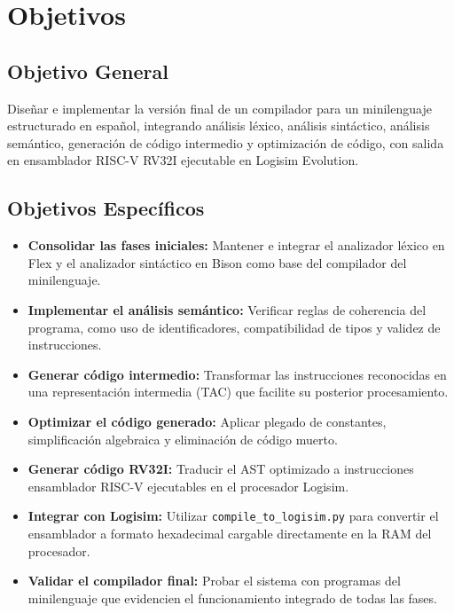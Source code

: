 \section{Objetivos}

\subsection{Objetivo General}

Diseñar e implementar la versión final de un compilador para un minilenguaje estructurado en español, integrando análisis léxico, análisis sintáctico, análisis semántico, generación de código intermedio y optimización de código, con salida en ensamblador RISC-V RV32I ejecutable en Logisim Evolution.

\subsection{Objetivos Específicos}

\begin{itemize}
    \item \textbf{Consolidar las fases iniciales:} Mantener e integrar el analizador léxico en Flex y el analizador sintáctico en Bison como base del compilador del minilenguaje.
    \item \textbf{Implementar el análisis semántico:} Verificar reglas de coherencia del programa, como uso de identificadores, compatibilidad de tipos y validez de instrucciones.
    \item \textbf{Generar código intermedio:} Transformar las instrucciones reconocidas en una representación intermedia (TAC) que facilite su posterior procesamiento.
    \item \textbf{Optimizar el código generado:} Aplicar plegado de constantes, simplificación algebraica y eliminación de código muerto.
    \item \textbf{Generar código RV32I:} Traducir el AST optimizado a instrucciones ensamblador RISC-V ejecutables en el procesador Logisim.
    \item \textbf{Integrar con Logisim:} Utilizar \texttt{compile\_to\_logisim.py} para convertir el ensamblador a formato hexadecimal cargable directamente en la RAM del procesador.
    \item \textbf{Validar el compilador final:} Probar el sistema con programas del minilenguaje que evidencien el funcionamiento integrado de todas las fases.
\end{itemize}
